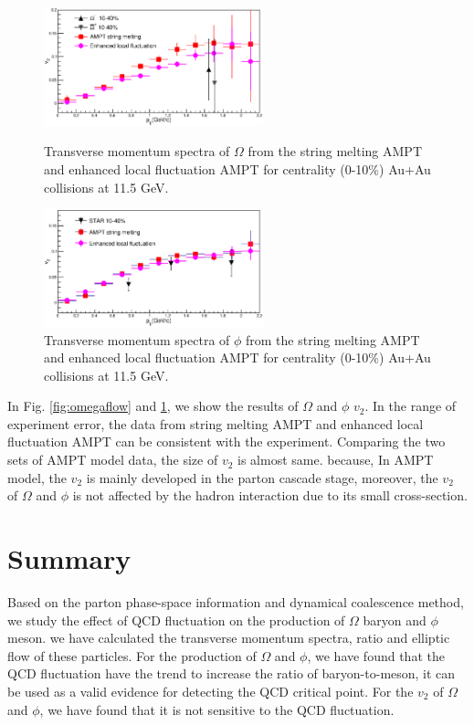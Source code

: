 \documentclass[11pt,a4paper,openany]{article}
\begin{document}
\begin{figure}[!ht]
  \begin{minipage}{0.5\textwidth}
    \centering
    \includegraphics[width=2.5in]{./figure/omegaFlow.eps}
    \caption{Transverse momentum spectra of $\Omega$ from the string melting AMPT and enhanced local
fluctuation AMPT for centrality (0-10\%) Au+Au collisions at 11.5 GeV.}
    \label{fig:omegaflow}
  \end{minipage}
  \begin{minipage}{0.5\textwidth}
    \centering
    \includegraphics[width=2.5in]{./figure/phiFlow.eps}
    \caption{Transverse momentum spectra of $\phi$ from the string melting AMPT and enhanced local
fluctuation AMPT for centrality (0-10\%) Au+Au collisions at 11.5 GeV.}
    \label{fig:phiflow}
  \end{minipage}
\end{figure}
In Fig. \ref{fig:omegaflow} and \ref{fig:phiflow}, we show the results of $\Omega$ and $\phi$ 
$v_{2}$. In  the range of experiment error, the data from string melting AMPT and enhanced local 
fluctuation AMPT can be consistent with the experiment. Comparing the two sets of AMPT model data, 
the size of  $v_{2}$ is almost same. because, In AMPT model, the $v_{2}$ is mainly developed in the 
parton cascade stage, moreover, the $v_{2}$ of $\Omega$ and $\phi$ is not affected by the hadron 
interaction due to its small cross-section. 

\section{Summary}
Based on the parton phase-space information and dynamical coalescence method, we study the effect
of QCD fluctuation on the production of $\Omega$ baryon and $\phi$ meson. we have calculated the
transverse momentum spectra, ratio and elliptic flow of these particles. For the production of 
$\Omega$ and $\phi$, we have found that the QCD fluctuation have the trend to increase the ratio
of baryon-to-meson, it can be used as a valid evidence for detecting the QCD critical point.
For the $v_{2}$ of $\Omega$ and $\phi$, we have found that it is not sensitive to the QCD 
fluctuation.
\end{document}
